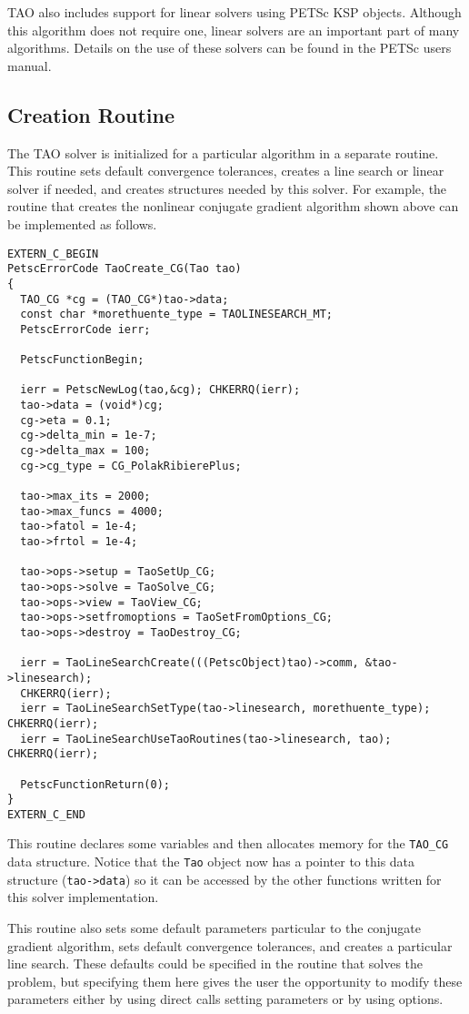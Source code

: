TAO also includes support for linear solvers using PETSc KSP objects.  
Although this algorithm
does not require one, linear solvers are an important part of many
algorithms.  Details on the use of these solvers can be found in
the PETSc users manual.

\subsection{Creation Routine}
The TAO solver is initialized for a particular algorithm in a separate
routine.  This routine sets default convergence tolerances, creates a
line search or linear solver if needed, and creates structures needed
by this solver.   For example, the routine that creates the nonlinear
conjugate gradient algorithm shown above can be implemented as follows.

\begin{verbatim}
EXTERN_C_BEGIN
PetscErrorCode TaoCreate_CG(Tao tao)
{
  TAO_CG *cg = (TAO_CG*)tao->data;
  const char *morethuente_type = TAOLINESEARCH_MT;
  PetscErrorCode ierr;

  PetscFunctionBegin;

  ierr = PetscNewLog(tao,&cg); CHKERRQ(ierr);
  tao->data = (void*)cg;
  cg->eta = 0.1;
  cg->delta_min = 1e-7;
  cg->delta_max = 100;
  cg->cg_type = CG_PolakRibierePlus;

  tao->max_its = 2000;
  tao->max_funcs = 4000;
  tao->fatol = 1e-4;
  tao->frtol = 1e-4;

  tao->ops->setup = TaoSetUp_CG;
  tao->ops->solve = TaoSolve_CG;
  tao->ops->view = TaoView_CG;
  tao->ops->setfromoptions = TaoSetFromOptions_CG;
  tao->ops->destroy = TaoDestroy_CG;

  ierr = TaoLineSearchCreate(((PetscObject)tao)->comm, &tao->linesearch);
  CHKERRQ(ierr);
  ierr = TaoLineSearchSetType(tao->linesearch, morethuente_type); CHKERRQ(ierr);
  ierr = TaoLineSearchUseTaoRoutines(tao->linesearch, tao); CHKERRQ(ierr);

  PetscFunctionReturn(0);
}
EXTERN_C_END
\end{verbatim}

\noindent This routine declares some variables and then allocates memory for the 
{\tt TAO\_CG} data structure. Notice that the \texttt{Tao} object 
now has a pointer to this data structure (\texttt{tao->data}) so it can be 
accessed by the other functions written for this solver implementation.

This routine also sets some default parameters particular to the conjugate
gradient algorithm, sets default convergence tolerances, and creates
a particular line search.
These defaults could be specified in the routine that solves the problem,
but specifying them here gives the user the opportunity to modify these
parameters either by using direct calls setting parameters or by using options.

